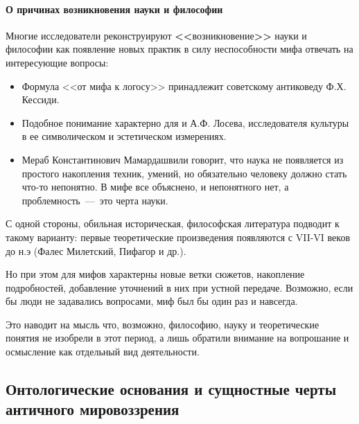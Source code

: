 
\paragraph{О причинах возникновения науки и философии}
Многие исследователи реконструируют \textbf{\Large<<}возникновение\textbf{\Large>>} науки и философии как  появление новых практик в силу неспособности мифа отвечать на интересующие вопросы:
\begin{itemize}
    \item Формула <<от мифа к логосу>> принадлежит советскому антиковеду Ф.Х. Кессиди.
    \item Подобное понимание характерно для и А.Ф. Лосева, исследователя культуры в ее символическом и эстетическом измерениях.
    \item Мераб Константинович Мамардашвили говорит, что наука не появляется из простого накопления техник, умений, но обязательно человеку должно стать что-то непонятно. В мифе все объяснено, и непонятного нет, а проблемность~---~это черта науки.
\end{itemize}

С одной стороны, обильная историческая, философская литература
подводит к такому варианту: первые теоретические произведения появляются с VII-VI веков до н.э (Фалес Милетский, Пифагор и др.).

Но при этом для мифов характерны новые ветки сюжетов, накопление подробностей, добавление уточнений в них при устной передаче. Возможно, если бы люди не задавались вопросами, миф был бы один раз и навсегда.

Это наводит на мысль что, возможно, философию, науку и теоретические понятия не изобрели в этот период, а лишь обратили внимание на вопрошание и осмысление как отдельный вид деятельности.

\subsection{Онтологические основания и сущностные черты античного мировоззрения}

